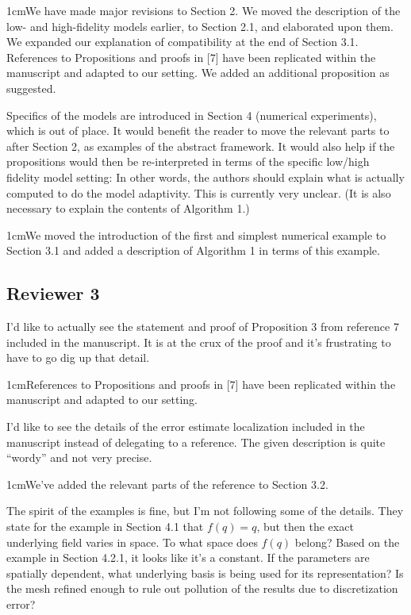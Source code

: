 \documentclass[12pt, letterpaper]{article}
\newcommand{\answer}[1]{\begin{adjustwidth}{1cm}{}{\color{blue}#1}\end{adjustwidth}}
\begin{document}
\answer{We have made major revisions to Section 2. We moved the description of the low- and high-fidelity models earlier, to Section 2.1, and elaborated upon them. We expanded our explanation of compatibility at the end of Section 3.1. References to Propositions and proofs in [7] have been replicated within the manuscript and adapted to our setting. We added an additional proposition as suggested.}

Specifics of the models are introduced in Section 4 (numerical experiments), which is out of place. It would benefit the reader to move the relevant parts to after Section 2, as examples of the abstract framework. It would also help if the propositions would then be re-interpreted in terms of the specific low/high fidelity model setting: In other words, the authors should explain what is actually computed to do the model adaptivity. This is currently very unclear. (It is also necessary to explain the contents of Algorithm 1.)

\answer{We moved the introduction of the first and simplest numerical example to Section 3.1 and added a description of Algorithm 1 in terms of this example.}


\subsection*{Reviewer 3}

I'd like to actually see the statement and proof of Proposition 3 from reference 7 included in
the manuscript. It is at the crux of the proof and it's frustrating to have to go dig up that
detail.

\answer{References to Propositions and proofs in [7] have been replicated within the manuscript and adapted to our setting.}

I'd like to see the details of the error estimate localization included in the manuscript instead
of delegating to a reference. The given description is quite “wordy” and not very precise.

\answer{We've added the relevant parts of the reference to Section 3.2.}

The spirit of the examples is fine, but I'm not following some of the details. They state for
the example in Section 4.1 that $f (q) = q$, but then the exact underlying field varies in space.
To what space does $f (q)$ belong? Based on the example in Section 4.2.1, it looks like it's
a constant. If the parameters are spatially dependent, what underlying basis is being used
for its representation? Is the mesh refined enough to rule out pollution of the results due to
discretization error?
\end{document}
